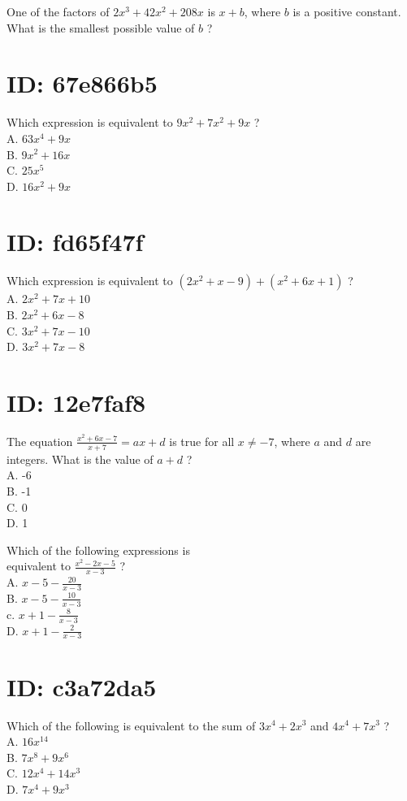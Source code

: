 One of the factors of $2 x^{3}+42 x^{2}+208 x$ is $x+b$, where $b$ is a positive constant. What is the smallest possible value of $b$ ?

\section*{ID: 67e866b5}
Which expression is equivalent to $9 x^{2}+7 x^{2}+9 x$ ?\\
A. $63 x^{4}+9 x$\\
B. $9 x^{2}+16 x$\\
C. $25 x^{5}$\\
D. $16 x^{2}+9 x$

\section*{ID: fd65f47f}
Which expression is equivalent to $\left(2 x^{2}+x-9\right)+\left(x^{2}+6 x+1\right)$ ?\\
A. $2 x^{2}+7 x+10$\\
B. $2 x^{2}+6 x-8$\\
C. $3 x^{2}+7 x-10$\\
D. $3 x^{2}+7 x-8$

\section*{ID: 12e7faf8}
The equation $\frac{x^{2}+6 x-7}{x+7}=a x+d$ is true for all $x \neq-7$, where $a$ and $d$ are integers. What is the value of $a+d$ ?\\
A. -6\\
B. -1\\
C. 0\\
D. 1

Which of the following expressions is\\
equivalent to $\frac{x^{2}-2 x-5}{x-3}$ ?\\
A. $x-5-\frac{20}{x-3}$\\
B. $x-5-\frac{10}{x-3}$\\
c. $x+1-\frac{8}{x-3}$\\
D. $x+1-\frac{2}{x-3}$

\section*{ID: c3a72da5}
Which of the following is equivalent to the sum of $3 x^{4}+2 x^{3}$ and $4 x^{4}+7 x^{3}$ ?\\
A. $16 x^{14}$\\
B. $7 x^{8}+9 x^{6}$\\
C. $12 x^{4}+14 x^{3}$\\
D. $7 x^{4}+9 x^{3}$

